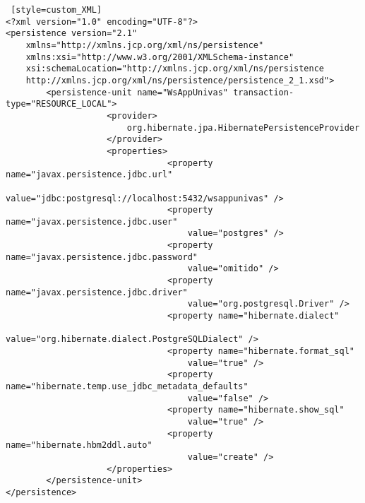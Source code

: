 \begin{lstlisting} [style=custom_XML]
<?xml version="1.0" encoding="UTF-8"?>
<persistence version="2.1"
	xmlns="http://xmlns.jcp.org/xml/ns/persistence" 
	xmlns:xsi="http://www.w3.org/2001/XMLSchema-instance"
	xsi:schemaLocation="http://xmlns.jcp.org/xml/ns/persistence
	http://xmlns.jcp.org/xml/ns/persistence/persistence_2_1.xsd">
		<persistence-unit name="WsAppUnivas" transaction-type="RESOURCE_LOCAL">
					<provider>
						org.hibernate.jpa.HibernatePersistenceProvider
					</provider>
					<properties>
								<property name="javax.persistence.jdbc.url"
									value="jdbc:postgresql://localhost:5432/wsappunivas" />
								<property name="javax.persistence.jdbc.user" 
									value="postgres" />
								<property name="javax.persistence.jdbc.password" 
									value="omitido" />
								<property name="javax.persistence.jdbc.driver" 
									value="org.postgresql.Driver" />
								<property name="hibernate.dialect" 
									value="org.hibernate.dialect.PostgreSQLDialect" />
								<property name="hibernate.format_sql" 
									value="true" />
								<property name="hibernate.temp.use_jdbc_metadata_defaults"
									value="false" />
								<property name="hibernate.show_sql" 
									value="true" />
								<property name="hibernate.hbm2ddl.auto" 
									value="create" />
					</properties>
		</persistence-unit>
</persistence>
\end{lstlisting}